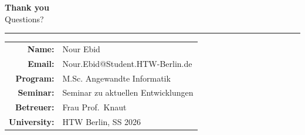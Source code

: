 \documentclass[aspectratio=169]{beamer}
\begin{document}
\begin{frame}[plain]
\begin{center}
    \vspace{1.5cm}
    {\Huge \textbf{Thank you}}\\[12pt]
    {\large Questions?}\\[30pt]
    \hrule
    \vspace{12pt}
    \begin{tabular}{rl}
        \textbf{Name:}      & Nour Ebid \\
        \textbf{Email:}     & Nour.Ebid@Student.HTW-Berlin.de \\
        \textbf{Program:}   & M.Sc. Angewandte Informatik \\
        \textbf{Seminar:}   & Seminar zu aktuellen Entwicklungen \\
        \textbf{Betreuer:}  & Frau Prof.\ Knaut \\
        \textbf{University:}& HTW Berlin, SS 2026 \\
    \end{tabular}
\end{center}
\end{frame}
\end{document}

